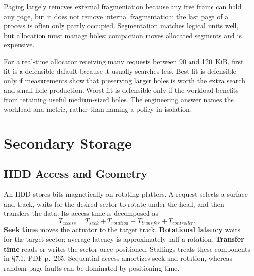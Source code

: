 \documentclass[11pt]{article}
\begin{document}
Paging largely removes external fragmentation because any free frame can hold
any page, but it does not remove internal fragmentation: the last page of a
process is often only partly occupied. Segmentation matches logical units well,
but allocation must manage holes; compaction moves allocated segments and is
expensive.

For a real-time allocator receiving many requests between 90 and 120~KiB,
first fit is a defensible default because it usually searches less. Best fit is
defensible only if measurements show that preserving larger holes is worth the
extra search and small-hole production. Worst fit is defensible only if the
workload benefits from retaining useful medium-sized holes. The engineering
answer names the workload and metric, rather than naming a policy in isolation.

\section{Secondary Storage}
\label{sec:storage}

\subsection{HDD Access and Geometry}

An HDD stores bits magnetically on rotating platters. A request selects a
surface and track, waits for the desired sector to rotate under the head, and
then transfers the data. Its access time is decomposed as
\[
  T_{access}=T_{seek}+T_{rotation}+T_{transfer}+T_{controller}.
\]
\textbf{Seek time} moves the actuator to the target track. \textbf{Rotational
latency} waits for the target sector; average latency is approximately half a
rotation. \textbf{Transfer time} reads or writes the sector once positioned.
Stallings treats these components in \S7.1, PDF p.~265. Sequential access
amortizes seek and rotation, whereas random page faults can be dominated by
positioning time.
\end{document}
